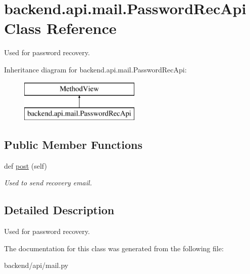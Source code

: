 \hypertarget{classbackend_1_1api_1_1mail_1_1_password_rec_api}{}\section{backend.\+api.\+mail.\+Password\+Rec\+Api Class Reference}
\label{classbackend_1_1api_1_1mail_1_1_password_rec_api}


Used for password recovery.  


Inheritance diagram for backend.\+api.\+mail.\+Password\+Rec\+Api\+:\begin{figure}[H]
\begin{center}
\leavevmode
\includegraphics[height=2.000000cm]{classbackend_1_1api_1_1mail_1_1_password_rec_api}
\end{center}
\end{figure}
\subsection*{Public Member Functions}
\begin{DoxyCompactItemize}
\item 
\hypertarget{classbackend_1_1api_1_1mail_1_1_password_rec_api_a48dbe3ebd89c06b5f601575b2a424eef}{}def \hyperlink{classbackend_1_1api_1_1mail_1_1_password_rec_api_a48dbe3ebd89c06b5f601575b2a424eef}{post} (self)\label{classbackend_1_1api_1_1mail_1_1_password_rec_api_a48dbe3ebd89c06b5f601575b2a424eef}

\begin{DoxyCompactList}\small\item\em Used to send recovery email. \end{DoxyCompactList}\end{DoxyCompactItemize}


\subsection{Detailed Description}
Used for password recovery. 

The documentation for this class was generated from the following file\+:\begin{DoxyCompactItemize}
\item 
backend/api/mail.\+py\end{DoxyCompactItemize}

